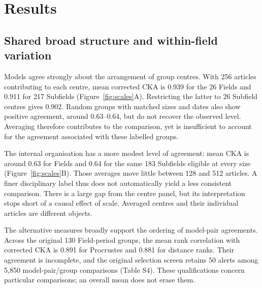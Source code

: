 \documentclass[12pt]{article}
\begin{document}
\section{Results}
\subsection{Shared broad structure and within-field variation}
Models agree strongly about the arrangement of group centres. With 256 articles contributing to each centre, mean corrected CKA is 0.939 for the 26 Fields and 0.911 for 217 Subfields (Figure~\ref{fig:scales}A). Restricting the latter to 26 Subfield centres gives 0.902. Random groups with matched sizes and dates also show positive agreement, around 0.63--0.64, but do not recover the observed level. Averaging therefore contributes to the comparison, yet is insufficient to account for the agreement associated with these labelled groups.

The internal organisation has a more modest level of agreement: mean CKA is around 0.63 for Fields and 0.64 for the same 183 Subfields eligible at every size (Figure~\ref{fig:scales}B). Those averages move little between 128 and 512 articles. A finer disciplinary label thus does not automatically yield a less consistent comparison. There is a large gap from the centre panel, but its interpretation stops short of a causal effect of scale. Averaged centres and their individual articles are different objects.

The alternative measures broadly support the ordering of model-pair agreements. Across the original 130 Field-period groups, the mean rank correlation with corrected CKA is 0.891 for Procrustes and 0.881 for distance ranks. Their agreement is incomplete, and the original selection screen retains 50 alerts among 5,850 model-pair/group comparisons (Table S4). These qualifications concern particular comparisons; an overall mean does not erase them.
\end{document}
